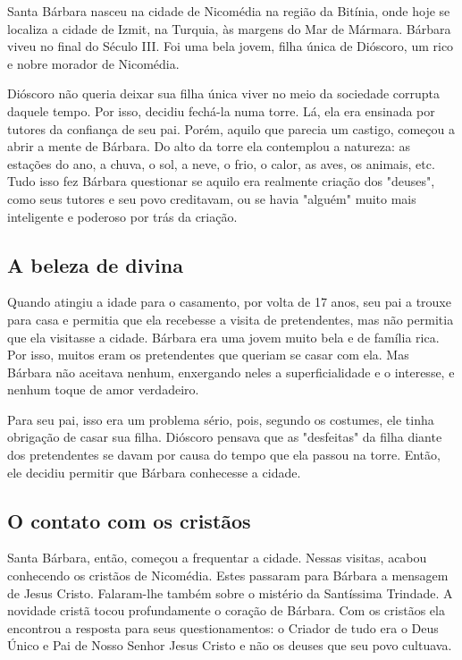 \documentclass[11pt]{article}
\begin{document}
\begin{justify}



  \par Santa Bárbara nasceu na cidade de Nicomédia na região da Bitínia, onde hoje se localiza a cidade de Izmit, na Turquia, às margens do Mar de Mármara. Bárbara viveu no final do Século III. Foi uma bela jovem, filha única de Dióscoro, um rico e nobre morador de Nicomédia.

Dióscoro não queria deixar sua filha única viver no meio da sociedade corrupta daquele tempo. Por isso, decidiu fechá-la numa torre. Lá, ela era ensinada por tutores da confiança de seu pai. Porém, aquilo que parecia um castigo, começou a abrir a mente de Bárbara. Do alto da torre ela contemplou a natureza: as estações do ano, a chuva, o sol, a neve, o frio, o calor, as aves, os animais, etc. Tudo isso fez Bárbara questionar se aquilo era realmente criação dos "deuses", como seus tutores e seu povo creditavam, ou se havia "alguém" muito mais inteligente e poderoso por trás da criação.

\subsection{A beleza de divina}

Quando atingiu a idade para o casamento, por volta de 17 anos, seu pai a trouxe para casa e permitia que ela recebesse a visita de pretendentes, mas não permitia que ela visitasse a cidade. Bárbara era uma jovem muito bela e de família rica. Por isso, muitos eram os pretendentes que queriam se casar com ela. Mas Bárbara não aceitava nenhum, enxergando neles a superficialidade e o interesse, e nenhum toque de amor verdadeiro.

Para seu pai, isso era um problema sério, pois, segundo os costumes, ele tinha obrigação de casar sua filha. Dióscoro pensava que as "desfeitas" da filha diante dos pretendentes se davam por causa do tempo que ela passou na torre. Então, ele decidiu permitir que Bárbara conhecesse a cidade.

\subsection{O contato com os cristãos}

Santa Bárbara, então, começou a frequentar a cidade. Nessas visitas, acabou conhecendo os cristãos de Nicomédia. Estes passaram para Bárbara a mensagem de Jesus Cristo. Falaram-lhe também sobre o mistério da Santíssima Trindade. A novidade cristã tocou profundamente o coração de Bárbara. Com os cristãos ela encontrou a resposta para seus questionamentos: o Criador de tudo era o Deus Único e Pai de Nosso Senhor Jesus Cristo e não os deuses que seu povo cultuava.


\end{justify}
\end{document}

